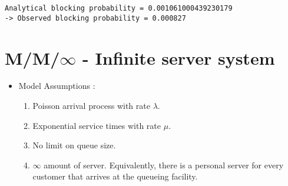 \documentclass[11pt]{article}
\providecommand{\tightlist}{%
      \setlength{\itemsep}{0pt}\setlength{\parskip}{0pt}}
\begin{document}
    \begin{Verbatim}[commandchars=\\\{\}]
Analytical blocking probability = 0.001061000439230179
-> Observed blocking probability = 0.000827
    \end{Verbatim}

    \newpage
    \section{M/M/\(\infty\) - Infinite server
system}

\begin{itemize}
\tightlist
\item
  Model Assumptions :

  \begin{enumerate}
  \def\labelenumi{\arabic{enumi}.}
  \tightlist
  \item
    Poisson arrival process with rate \(\lambda\).
  \item
    Exponential service times with rate \(\mu\).
  \item
    No limit on queue size.
  \item
    \(\infty\) amount of server. Equivalently, there is a personal
    server for every customer that arrives at the queueing facility.
  \end{enumerate}
\end{itemize}
\end{document}
